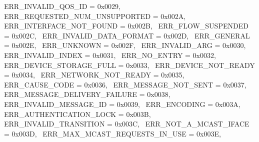 \begin{DoxyItemize}
 E\+R\+R\+\_\+\+I\+N\+V\+A\+L\+I\+D\+\_\+\+Q\+O\+S\+\_\+\+ID = 0x0029,~\newline
 E\+R\+R\+\_\+\+R\+E\+Q\+U\+E\+S\+T\+E\+D\+\_\+\+N\+U\+M\+\_\+\+U\+N\+S\+U\+P\+P\+O\+R\+T\+ED = 0x002A,~\newline
 E\+R\+R\+\_\+\+I\+N\+T\+E\+R\+F\+A\+C\+E\+\_\+\+N\+O\+T\+\_\+\+F\+O\+U\+ND = 0x002B,~\newline
 E\+R\+R\+\_\+\+F\+L\+O\+W\+\_\+\+S\+U\+S\+P\+E\+N\+D\+ED = 0x002C,~\newline
 E\+R\+R\+\_\+\+I\+N\+V\+A\+L\+I\+D\+\_\+\+D\+A\+T\+A\+\_\+\+F\+O\+R\+M\+AT = 0x002D,~\newline
 E\+R\+R\+\_\+\+G\+E\+N\+E\+R\+AL = 0x002E,~\newline
 E\+R\+R\+\_\+\+U\+N\+K\+N\+O\+WN = 0x002F,~\newline
 E\+R\+R\+\_\+\+I\+N\+V\+A\+L\+I\+D\+\_\+\+A\+RG = 0x0030,~\newline
 E\+R\+R\+\_\+\+I\+N\+V\+A\+L\+I\+D\+\_\+\+I\+N\+D\+EX = 0x0031,~\newline
 E\+R\+R\+\_\+\+N\+O\+\_\+\+E\+N\+T\+RY = 0x0032,~\newline
 E\+R\+R\+\_\+\+D\+E\+V\+I\+C\+E\+\_\+\+S\+T\+O\+R\+A\+G\+E\+\_\+\+F\+U\+LL = 0x0033,~\newline
 E\+R\+R\+\_\+\+D\+E\+V\+I\+C\+E\+\_\+\+N\+O\+T\+\_\+\+R\+E\+A\+DY = 0x0034,~\newline
 E\+R\+R\+\_\+\+N\+E\+T\+W\+O\+R\+K\+\_\+\+N\+O\+T\+\_\+\+R\+E\+A\+DY = 0x0035,~\newline
 E\+R\+R\+\_\+\+C\+A\+U\+S\+E\+\_\+\+C\+O\+DE = 0x0036,~\newline
 E\+R\+R\+\_\+\+M\+E\+S\+S\+A\+G\+E\+\_\+\+N\+O\+T\+\_\+\+S\+E\+NT = 0x0037,~\newline
 E\+R\+R\+\_\+\+M\+E\+S\+S\+A\+G\+E\+\_\+\+D\+E\+L\+I\+V\+E\+R\+Y\+\_\+\+F\+A\+I\+L\+U\+RE = 0x0038,~\newline
 E\+R\+R\+\_\+\+I\+N\+V\+A\+L\+I\+D\+\_\+\+M\+E\+S\+S\+A\+G\+E\+\_\+\+ID = 0x0039,~\newline
 E\+R\+R\+\_\+\+E\+N\+C\+O\+D\+I\+NG = 0x003A,~\newline
 E\+R\+R\+\_\+\+A\+U\+T\+H\+E\+N\+T\+I\+C\+A\+T\+I\+O\+N\+\_\+\+L\+O\+CK = 0x003B,~\newline
 E\+R\+R\+\_\+\+I\+N\+V\+A\+L\+I\+D\+\_\+\+T\+R\+A\+N\+S\+I\+T\+I\+ON = 0x003C,~\newline
 E\+R\+R\+\_\+\+N\+O\+T\+\_\+\+A\+\_\+\+M\+C\+A\+S\+T\+\_\+\+I\+F\+A\+CE = 0x003D,~\newline
 E\+R\+R\+\_\+\+M\+A\+X\+\_\+\+M\+C\+A\+S\+T\+\_\+\+R\+E\+Q\+U\+E\+S\+T\+S\+\_\+\+I\+N\+\_\+\+U\+SE = 0x003E,~\newline

\end{DoxyItemize}
